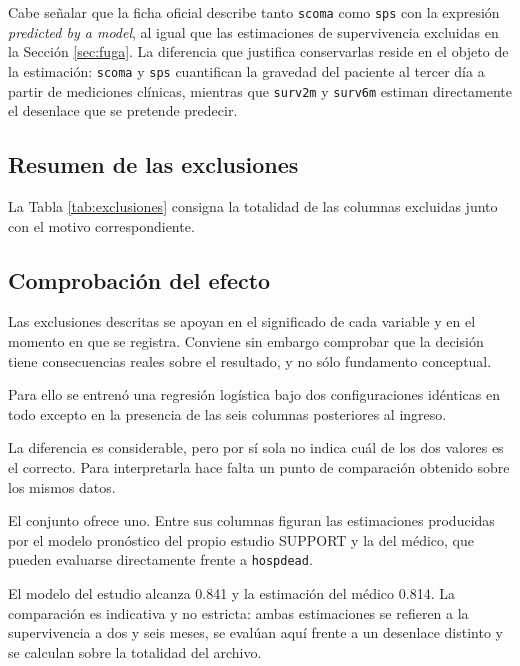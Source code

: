 \documentclass[11pt]{article}
\begin{document}
Cabe señalar que la ficha oficial describe tanto \texttt{scoma} como \texttt{sps} con la
expresión \textit{predicted by a model}, al igual que las estimaciones de supervivencia
excluidas en la Sección \ref{sec:fuga}. La diferencia que justifica conservarlas reside en el
objeto de la estimación: \texttt{scoma} y \texttt{sps} cuantifican la gravedad del paciente al
tercer día a partir de mediciones clínicas, mientras que \texttt{surv2m} y \texttt{surv6m}
estiman directamente el desenlace que se pretende predecir.

\subsection{Resumen de las exclusiones}

La Tabla \ref{tab:exclusiones} consigna la totalidad de las columnas excluidas junto con el motivo
correspondiente.



\subsection{Comprobación del efecto}
\label{sec:evidencia}

Las exclusiones descritas se apoyan en el significado de cada variable y en el momento en que se
registra. Conviene sin embargo comprobar que la decisión tiene consecuencias reales sobre el
resultado, y no sólo fundamento conceptual.

Para ello se entrenó una regresión logística bajo dos configuraciones idénticas en todo excepto
en la presencia de las seis columnas posteriores al ingreso.



La diferencia es considerable, pero por sí sola no indica cuál de los dos valores es el correcto.
Para interpretarla hace falta un punto de comparación obtenido sobre los mismos datos.

El conjunto ofrece uno. Entre sus columnas figuran las estimaciones producidas por el modelo
pronóstico del propio estudio SUPPORT y la del médico, que pueden evaluarse directamente
frente a \texttt{hospdead}.



El modelo del estudio alcanza 0.841 y la estimación del médico 0.814. La comparación es
indicativa y no estricta: ambas estimaciones se refieren a la supervivencia a dos y seis meses, se
evalúan aquí frente a un desenlace distinto y se calculan sobre la totalidad del archivo.
\end{document}
